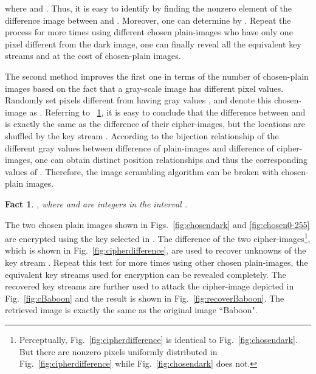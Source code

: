 \documentclass[smallextended, final]{svjour3}          \smartqed
\newtheorem{Fact}{Fact}
\begin{document}
where  and . Thus, it is easy to identify  by finding the nonzero element
of the difference image between  and . Moreover, one can determine 
by .
Repeat the process for  more times using different chosen plain-images who have
only one pixel different from the dark image, one can finally reveal all the
equivalent key streams  and  at the
cost of  chosen-plain images.


The second method improves the first one in terms of the number of chosen-plain
images based on the fact that a gray-scale image has  different pixel values.
Randomly set  pixels different from  having gray values , and denote this chosen-image as .
Referring to ~\ref{fact2}, it is easy to conclude that the difference between  and  is exactly the same
as the difference of their cipher-images, but the locations are shuffled by the key stream  .
According to the bijection relationship of the  different gray values between difference of plain-images and difference of cipher-images,
one can obtain  distinct position relationships and thus the corresponding values of .
Therefore, the image scrambling algorithm can be broken with
 chosen-plain images.
\begin{Fact}
\label{fact2}
, where  and  are integers in the interval .
\end{Fact}

The two chosen plain images shown in Figs.~\ref{fig:chosendark} and \ref{fig:chosen0-255} are encrypted using the key selected in \cite[Sec.~4.1]{li2012image}.
The difference of the two cipher-images\footnote{Perceptually, Fig.~\ref{fig:cipherdifference} is identical to Fig.~\ref{fig:chosendark}. But
there are  nonzero pixels uniformly distributed in Fig.~\ref{fig:cipherdifference} while  Fig.~\ref{fig:chosendark} does not.},
which is shown in Fig.~\ref{fig:cipherdifference}, are used to recover  unknowns of the key stream .
Repeat this test for  more times using other chosen plain-images, the equivalent key streams used for encryption can be revealed completely.
The recovered key streams are further used to attack the cipher-image depicted in Fig.~\ref{fig:cBaboon} and the result is shown in Fig.~\ref{fig:recoverBaboon}.
The retrieved image is exactly the same as the original image ``Baboon".
\end{document}
